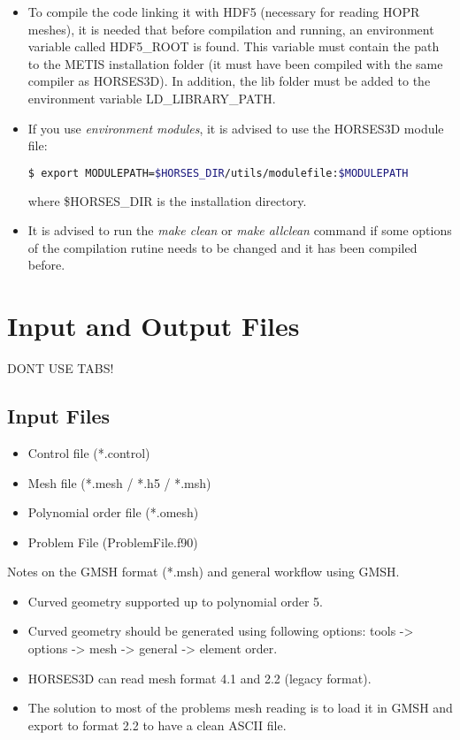 \documentclass[a4paper,10pt]{report}
\begin{document}
\begin{itemize}
\item To compile the code linking it with HDF5 (necessary for reading HOPR meshes), it is needed that before compilation and running, an environment variable called HDF5\_ROOT is found. This variable must contain the path to the METIS installation folder (it must have been compiled with the same compiler as HORSES3D). In addition, the lib folder must be added to the environment variable LD\_LIBRARY\_PATH.

\item If you use \textit{environment modules}, it is advised to use the HORSES3D module file:\\
\begin{lstlisting}[language=bash]
	$ export MODULEPATH=$HORSES_DIR/utils/modulefile:$MODULEPATH
\end{lstlisting}
where \$HORSES\_DIR is the installation directory.

\item It is advised to run the \emph{make clean} or \emph{make allclean} command if some options of the compilation rutine needs to be changed and it has been compiled before.

\end{itemize}

\chapter{Input and Output Files}

DONT USE TABS!

\section{Input Files}
\begin{itemize}
\item Control file (*.control)
\item Mesh file (*.mesh / *.h5 / *.msh)
\item Polynomial order file (*.omesh)
\item Problem File (ProblemFile.f90)
\end{itemize}

{ \small
Notes on the GMSH format (*.msh) and general workflow using GMSH.
\begin{itemize}
\item Curved geometry supported up to polynomial order 5.
\item Curved geometry should be generated using following options: tools -> options -> mesh -> general -> element order.
\item HORSES3D can read mesh format 4.1 and 2.2 (legacy format).
\item The solution to most of the problems mesh reading is to load it in GMSH and export to format 2.2 to have a clean ASCII file.
\end{itemize}
}
\end{document}
